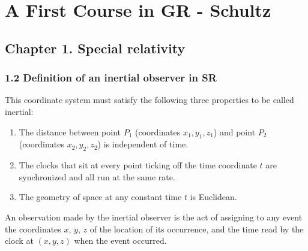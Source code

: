 \documentclass[12pt]{book}
\begin{document}
\chapter{A First Course in GR - Schultz}

\section{Chapter 1. Special relativity}
    \subsection{1.2 Definition of an inertial observer in SR}
        This coordinate system must satisfy the following three properties to be called inertial:

        \begin{enumerate}
            \item The distance between point \( P_1 \) (coordinates \( x_1, y_1, z_1 \)) and point \( P_2 \) (coordinates \( x_2, y_2, z_2 \)) is independent of time.
            \item The clocks that sit at every point ticking off the time coordinate \( t \) are synchronized and all run at the same rate.
            \item The geometry of space at any constant time \( t \) is Euclidean.
        \end{enumerate}
        An observation made by the inertial observer is the act of assigning to any event the coordinates \( x \), \( y \), \( z \) of the location of its occurrence, and the time read by the clock at \( (x, y, z) \) when the event occurred.
\end{document}
